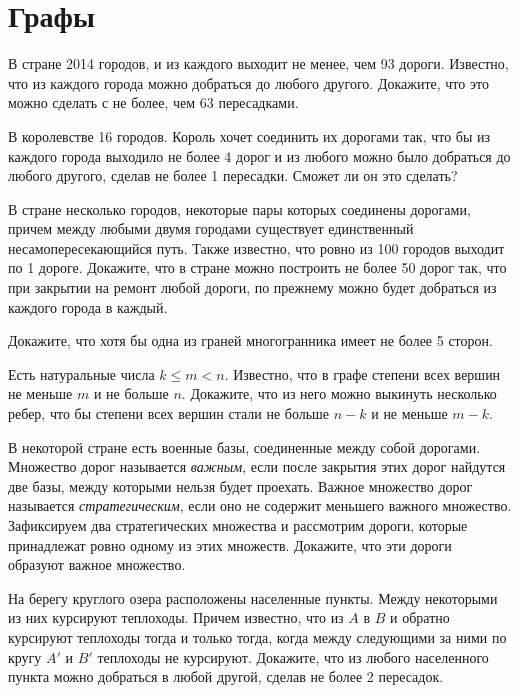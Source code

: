 

\section*{Графы}


\begin{problems}

\item
В стране 2014 городов, и из каждого выходит не менее, чем 93 дороги.
Известно, что из каждого города можно добраться до любого другого.
Докажите, что это можно сделать с не более, чем 63 пересадками.

\item
В королевстве 16 городов.
Король хочет соединить их дорогами так, что бы из каждого города выходило не
более 4 дорог и из любого можно было добраться до любого другого, сделав не
более 1 пересадки.
Сможет ли он это сделать?

\item
В стране несколько городов, некоторые пары которых соединены дорогами, причем
между любыми двумя городами существует единственный несамопересекающийся путь.
Также известно, что ровно из 100 городов выходит по 1 дороге.
Докажите, что в стране можно построить не более 50 дорог так, что при закрытии
на ремонт любой дороги, по прежнему можно будет добраться из каждого города в
каждый.

\item
Докажите, что хотя бы одна из граней многогранника имеет не более 5 сторон.

\item
Есть натуральные числа $k \leq m < n$.
Известно, что в графе степени всех вершин не меньше $m$ и не больше $n$.
Докажите, что из него можно выкинуть несколько ребер, что бы степени всех
вершин стали не больше $n - k$ и не меньше $m - k$.

\item
В некоторой стране есть военные базы, соединенные между собой дорогами.
Множество дорог называется \emph{важным}, если после закрытия этих дорог
найдутся две базы, между которыми нельзя будет проехать.
Важное множество дорог называется \emph{стратегическим}, если оно не содержит
меньшего важного множество.
Зафиксируем два стратегических множества и рассмотрим дороги, которые
принадлежат ровно одному из этих множеств.
Докажите, что эти дороги образуют важное множество.

\item
На берегу круглого озера расположены населенные пункты.
Между некоторыми из них курсируют теплоходы.
Причем известно, что из $A$ в $B$ и обратно курсируют теплоходы тогда и только
тогда, когда между следующими за ними по кругу $A'$ и $B'$ теплоходы не
курсируют.
Докажите, что из любого населенного пункта можно добраться в любой другой,
сделав не более 2 пересадок.

\end{problems}

